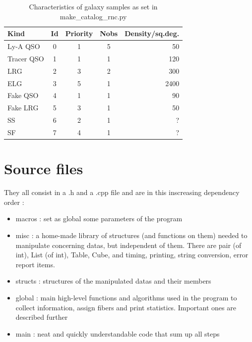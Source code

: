 \documentclass[10pt]{extarticle}
\begin{document}
\begin{multicols}{2}
\begin{table}[H]\begin{center}
	\caption{Characteristics of galaxy samples as set in make\_catalog\_rnc.py}\label{tab:characteristics}
	\begin{tabular}{lcccr}\\ \hline
		Kind&Id&Priority&Nobs&Density/sq.deg.\\ \hline
		Ly-A QSO & 0 & 1 & 5 &  50\\
		Tracer QSO & 1 & 1 & 1& 120\\
		LRG & 2 & 3 &2 & 300\\
		ELG & 3 & 5 & 1 & 2400\\
		Fake QSO & 4 & 1 & 1& 90\\
		Fake LRG & 5 & 3 & 1 & 50\\
		SS & 6 & 2 & 1&  ?\\
		SF & 7 & 4 & 1& ?\\ \hline
	\end{tabular}\end{center}
\end{table}


\section{Source files}
They all consist in a .h and a .cpp file and are in this inscreasing dependency order :
\begin{itemize} 
	\item macros : set as global some parameters of the program
	\item misc : a home-made library of structures (and functions on them) needed to manipulate concerning datas, but independent of them. There are pair (of int), List (of int), Table, Cube, and timing, printing, string conversion, error report items.
	\item structs : structures of the manipulated datas and their members
	\item global : main high-level functions and algorithms used in the program to collect information, assign fibers and print statistics. Important ones are described further
	\item main : neat and quickly understandable code that sum up all steps
\end{itemize} 


\end{multicols}
\end{document}
